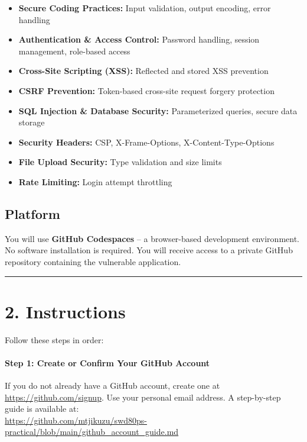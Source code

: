 \documentclass[12pt,a4paper]{article}
\begin{document}
\begin{itemize}
  \item \textbf{Secure Coding Practices:} Input validation, output encoding, error handling
  \item \textbf{Authentication \& Access Control:} Password handling, session management, role-based access
  \item \textbf{Cross-Site Scripting (XSS):} Reflected and stored XSS prevention
  \item \textbf{CSRF Prevention:} Token-based cross-site request forgery protection
  \item \textbf{SQL Injection \& Database Security:} Parameterized queries, secure data storage
  \item \textbf{Security Headers:} CSP, X-Frame-Options, X-Content-Type-Options
  \item \textbf{File Upload Security:} Type validation and size limits
  \item \textbf{Rate Limiting:} Login attempt throttling
\end{itemize}

\subsection*{Platform}
You will use \textbf{GitHub Codespaces} -- a browser-based development environment. No software installation is required. You will receive access to a private GitHub repository containing the vulnerable application.

\vspace{0.5cm}
\hrule
\vspace{0.5cm}

\section*{2. Instructions}

Follow these steps in order:

\paragraph{Step 1: Create or Confirm Your GitHub Account}
If you do not already have a GitHub account, create one at \url{https://github.com/signup}. Use your personal email address. A step-by-step guide is available at: \\\url{https://github.com/mtjikuzu/swd80ps-practical/blob/main/github_account_guide.md}
\end{document}
